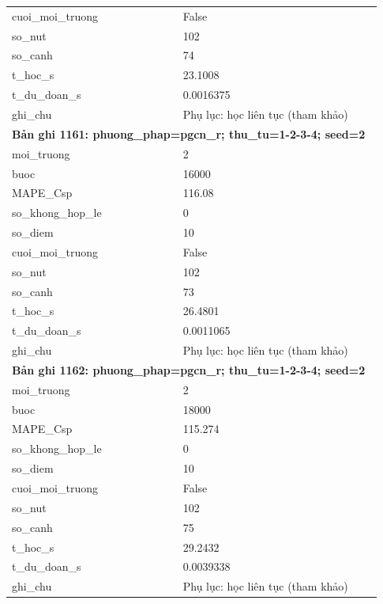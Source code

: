 \begin{longtable}{p{0.43\linewidth}p{0.50\linewidth}}
cuoi\_\allowbreak moi\_\allowbreak truong & False \\
so\_\allowbreak nut & 102 \\
so\_\allowbreak canh & 74 \\
t\_\allowbreak hoc\_\allowbreak s & 23.1008 \\
t\_\allowbreak du\_\allowbreak doan\_\allowbreak s & 0.0016375 \\
ghi\_\allowbreak chu & Phụ lục: học liên tục (tham khảo) \\
\midrule
\multicolumn{2}{p{0.95\linewidth}}{\textbf{Bản ghi 1161: phuong\_phap=pgcn\_r; thu\_tu=1-2-3-4; seed=2}} \\
moi\_\allowbreak truong & 2 \\
buoc & 16000 \\
MAPE\_\allowbreak Csp & 116.08 \\
so\_\allowbreak khong\_\allowbreak hop\_\allowbreak le & 0 \\
so\_\allowbreak diem & 10 \\
cuoi\_\allowbreak moi\_\allowbreak truong & False \\
so\_\allowbreak nut & 102 \\
so\_\allowbreak canh & 73 \\
t\_\allowbreak hoc\_\allowbreak s & 26.4801 \\
t\_\allowbreak du\_\allowbreak doan\_\allowbreak s & 0.0011065 \\
ghi\_\allowbreak chu & Phụ lục: học liên tục (tham khảo) \\
\midrule
\multicolumn{2}{p{0.95\linewidth}}{\textbf{Bản ghi 1162: phuong\_phap=pgcn\_r; thu\_tu=1-2-3-4; seed=2}} \\
moi\_\allowbreak truong & 2 \\
buoc & 18000 \\
MAPE\_\allowbreak Csp & 115.274 \\
so\_\allowbreak khong\_\allowbreak hop\_\allowbreak le & 0 \\
so\_\allowbreak diem & 10 \\
cuoi\_\allowbreak moi\_\allowbreak truong & False \\
so\_\allowbreak nut & 102 \\
so\_\allowbreak canh & 75 \\
t\_\allowbreak hoc\_\allowbreak s & 29.2432 \\
t\_\allowbreak du\_\allowbreak doan\_\allowbreak s & 0.0039338 \\
ghi\_\allowbreak chu & Phụ lục: học liên tục (tham khảo) \\

\end{longtable}
